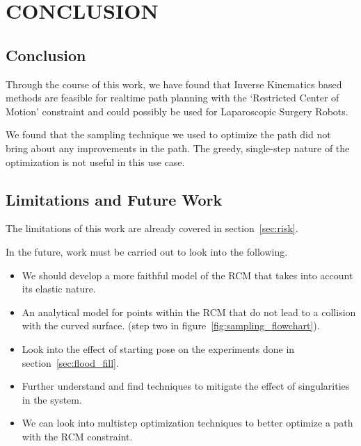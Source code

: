 \documentclass[BTech]{iitmdiss}
\begin{document}
    \chapter{CONCLUSION}\label{ch:conclusion}


    \section{Conclusion}

    Through the course of this work, we have found that Inverse Kinematics based methods are feasible for realtime path planning with the
    `Restricted Center of Motion' constraint and could possibly be used for Laparoscopic Surgery Robots.

    We found that the sampling technique we used to optimize the path did not bring about any improvements in the path.
    The greedy, single-step nature of the optimization is not useful in this use case.


    \section{Limitations and Future Work}

    The limitations of this work are already covered in section~\ref{sec:risk}.

    \noindent In the future, work must be carried out to look into the following.
    \begin{itemize}
        \item We should develop a more faithful model of the RCM that takes into account its elastic nature.
        \item An analytical model for points within the RCM that do not lead to a collision with the curved surface.
        (step two in figure~\ref{fig:sampling_flowchart}).
        \item Look into the effect of starting pose on the experiments done in section~\ref{sec:flood_fill}.
        \item Further understand and find techniques to mitigate the effect of singularities in the system.
        \item We can look into multistep optimization techniques to better optimize a path with the RCM constraint.
    \end{itemize}


    \appendix
\end{document}
